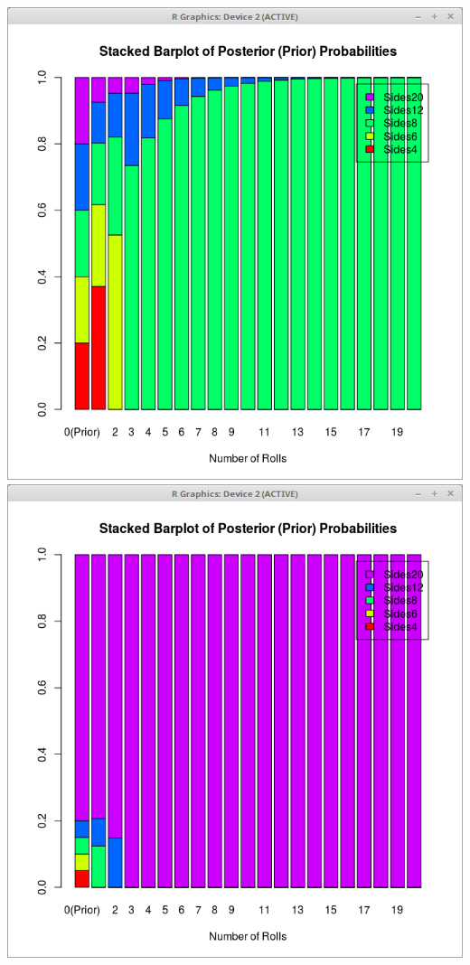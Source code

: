 \documentclass[a5paper,11pt]{article}
\begin{document}
\includegraphics[scale=0.5]{uniform-dist.png}
\includegraphics[scale=0.5]{skewed-dist.png}
\end{document}
